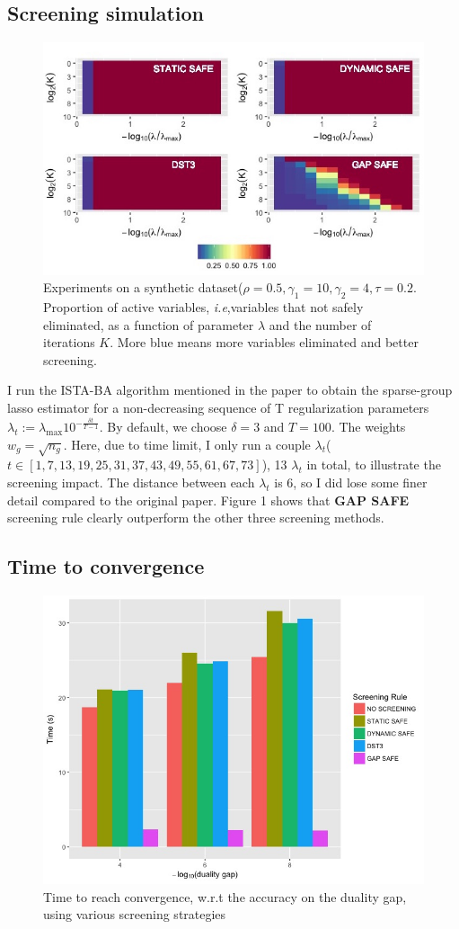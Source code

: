 \documentclass{article}
\begin{document}
\subsection{Screening simulation}
\begin{figure}[h]
  \centering
\includegraphics[width=0.8\linewidth]{screening.jpeg}
  \caption{Experiments on a synthetic dataset($\rho = 0.5, \gamma_1 = 10, \gamma_2 = 4, \tau = 0.2$.  Proportion of active variables, \textit{i.e},variables that not safely eliminated, as a function of parameter $\lambda$ and the number of iterations $K$. More blue means more variables eliminated and better screening.}
\end{figure}

I run the ISTA-BA algorithm mentioned in the paper to obtain the sparse-group lasso estimator for a non-decreasing sequence of T regularization parameters $\lambda_t := \lambda_{\text{max}} 10^{-\frac{\delta t}{T-1}}$. By default, we choose $\delta = 3$ and $T = 100$. The weights $w_g = \sqrt{n_g}$.  Here, due to time limit, I only run a couple $\lambda_t$($t \in [1,7,13,19,25,31,37,43,49,55,61,67,73]$), 13 $\lambda_t$ in total,  to illustrate the screening impact. The distance between each $\lambda_t$ is  6, so I  did lose some finer detail compared to the original paper.  Figure 1 shows that \textbf{GAP SAFE} screening rule clearly outperform the other three screening methods.  


\subsection{Time to convergence}
\begin{figure}[h]
  \centering
\includegraphics[width=0.8\linewidth]{time.jpeg}
  \caption{Time to reach convergence, w.r.t the accuracy on  the duality gap, using various screening strategies}
\end{figure}
\end{document}
